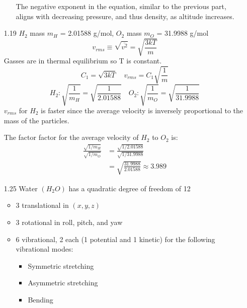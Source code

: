 \documentclass{article}
\begin{document}
\begin{enumerate}
\begin{enumerate}
            The negative exponent in the equation, similar to the previous part, aligns with decreasing pressure, and thus density, as altitude increases.
    \end{enumerate}
    \vspace{0.1in}
    \item [1.19]
        \(H_2\) mass \(m_H\) = 2.01588 g/mol, \(O_2\) mass \(m_O\) = 31.9988 g/mol
        \begin{equation*}
            v_{rms} \equiv \sqrt{\overline{v^2}} = \sqrt{\frac{3kT}{m}}
        \end{equation*}
        Gasses are in thermal equilibrium so T is constant.
        \begin{equation*}
            C_1 = \sqrt{3kT} \quad v_{rms} = C_1 \sqrt{\frac{1}{m}}
        \end{equation*} 
        \begin{equation*}
            H_2: \sqrt{\frac{1}{m_H}} = \sqrt{\frac{1}{2.01588}} \quad O_2: \sqrt{\frac{1}{m_O}} = \sqrt{\frac{1}{31.9988}}
        \end{equation*}
        \(v_{rms}\) for \(H_2\) is faster since the average velocity is inversely proportional to the mass of the particles.
         
        The factor factor for the average velocity of \(H_2\) to \(O_2\) is:
        \begin{align*}
            \frac{\sqrt{1/m_H}}{\sqrt{1/m_O}} &= \frac{\sqrt{1/2.01588}}{\sqrt{1/31.9988}} \\
            &= \sqrt{\frac{31.9988}{2.01588}} \approx 3.989
        \end{align*}
    \vspace{0.1in}
    \item [1.25]
        Water \(\left(H_2O\right)\) has a quadratic degree of freedom of 12
        \begin{itemize}
            \item 3 translational in \(\left(x, y, z\right)\)
            \item 3 rotational in roll, pitch, and yaw
            \item 6 vibrational, 2 each (1 potential and 1 kinetic) for the following vibrational modes:
            \begin{itemize}
                \item Symmetric stretching
                \item Asymmetric stretching
                \item Bending
            \end{itemize}
        \end{itemize}

\end{enumerate}
\end{document}
